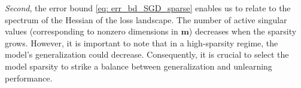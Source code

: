 \textit{Second}, the error bound \eqref{eq: err_bd_SGD_sparse}  enables us to relate {\MU} to the  spectrum of the  Hessian  of the loss landscape. 
The number of active singular values (corresponding to nonzero dimensions in $\mathbf m$) decreases when the sparsity grows.
However, it is important to note that in a high-sparsity regime, the model's generalization   could   decrease. Consequently, it is crucial to  select the model sparsity to strike a balance between generalization   and unlearning performance.







